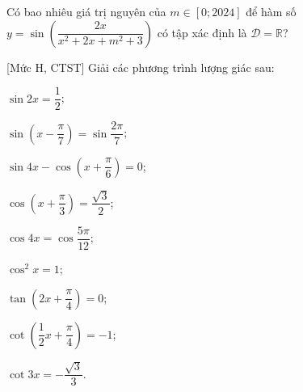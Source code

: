 \begin{ex}%
	Có bao  nhiêu giá trị nguyên của $m\in[0;2024]$ để hàm số $y=\sin \left(\dfrac{2x}{x^2+2x+m^2+3} \right)$ có tập xác định là $\mathscr{D}=\mathbb{R}$?
\end{ex}

\begin{bt}%
[Mức H, CTST]%
	Giải các phương trình lượng giác sau:
	\begin{listEX}[3]
		\item $\sin 2 x=\dfrac{1}{2}$;
		\item $\sin \left(x-\dfrac{\pi}{7}\right)=\sin \dfrac{2 \pi}{7}$;
		\item $\sin 4 x-\cos \left(x+\dfrac{\pi}{6}\right)=0$;
		\item $\cos \left(x+\dfrac{\pi}{3}\right)=\dfrac{\sqrt{3}}{2}$;
		\item $\cos 4 x=\cos \dfrac{5 \pi}{12}$;
		\item $\cos ^2 x=1$;
		\item $\tan \left(2 x+\dfrac{\pi}{4}\right)=0$;
		\item $\cot \left(\dfrac{1}{2} x+\dfrac{\pi}{4}\right)=-1$;
		\item $\cot 3 x=-\dfrac{\sqrt{3}}{3}$.
	\end{listEX}
\end{bt}
